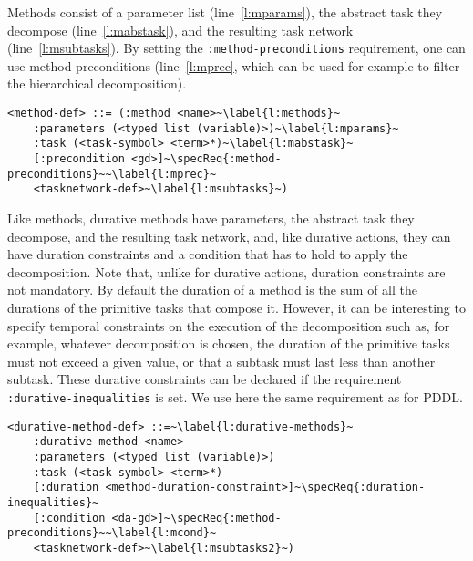 \documentclass[letterpaper]{article} %
\begin{document}


%
%
Methods consist of a parameter list (line~\ref{l:mparams}), the abstract task they decompose (line~\ref{l:mabstask}), and the resulting task network (line~\ref{l:msubtasks}). By setting the \verb+:method-preconditions+ requirement, one can use method preconditions (line~\ref{l:mprec}, which can be used for example to filter the hierarchical decomposition).

\begin{lstlisting}[firstnumber=last, escapechar=~]
<method-def> ::= (:method <name>~\label{l:methods}~
    :parameters (<typed list (variable)>)~\label{l:mparams}~
    :task (<task-symbol> <term>*)~\label{l:mabstask}~
    [:precondition <gd>]~\specReq{:method-preconditions}~~\label{l:mprec}~
    <tasknetwork-def>~\label{l:msubtasks}~)
\end{lstlisting}

%
%
Like methods, durative methods have parameters, the abstract task they decompose, and the resulting task network, and, like durative actions, they can have duration constraints and a condition that has to hold to apply the decomposition. Note that, unlike for durative actions, duration constraints are not mandatory. By default the duration of a method is the sum of all the durations of the primitive tasks that compose it. However, it can be interesting to specify temporal constraints on the execution of the decomposition such as, for example, whatever decomposition is chosen, the duration of the primitive tasks must not exceed a given value, or that a subtask must last less than another subtask. These durative constraints can be declared if the requirement {\tt :durative-inequalities} is set. We use here the same requirement as for PDDL.

\begin{lstlisting}[firstnumber=last, escapechar=~]
<durative-method-def> ::=~\label{l:durative-methods}~
    :durative-method <name>
    :parameters (<typed list (variable)>)
    :task (<task-symbol> <term>*)
    [:duration <method-duration-constraint>]~\specReq{:duration-inequalities}~
    [:condition <da-gd>]~\specReq{:method-preconditions}~~\label{l:mcond}~
    <tasknetwork-def>~\label{l:msubtasks2}~)
\end{lstlisting}


\end{document}
